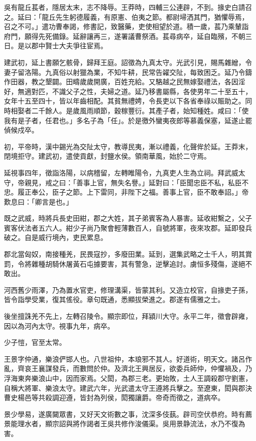 \begin{pinyinscope}
吳有龍丘萇者，隱居太末，志不降辱。王莽時，四輔三公連辟，不到。掾史白請召之。延曰：「龍丘先生躬德履義，有原憲、伯夷之節。都尉埽洒其門，猶懼辱焉，召之不可。」遣功曹奉謁，修書記，致醫藥，吏使相望於道。積一歲，萇乃乘輦詣府門，願得先死備錄。延辭讓再三，遂署議曹祭酒。萇尋病卒，延自臨殯，不朝三日。是以郡中賢士大夫爭往宦焉。

建武初，延上書願乞骸骨，歸拜王庭。詔徵為九真太守。光武引見，賜馬雜繒，令妻子留洛陽。九真俗以射獵為業，不知牛耕，民常告糴交阯，每致困乏。延乃令鑄作田器，教之墾闢。田疇歲歲開廣，百姓充給。又駱越之民無嫁娶禮法，各因淫好，無適對匹，不識父子之性，夫婦之道。延乃移書屬縣，各使男年二十至五十，女年十五至四十，皆以年齒相配。其貧無禮娉，令長吏以下各省奉祿以賑助之。同時相娶者二千餘人。是歲風雨順節，穀稼豐衍。其產子者，始知種姓。咸曰：「使我有是子者，任君也。」多名子為「任」。於是徼外蠻夷夜郎等慕義保塞，延遂止罷偵候戍卒。

初，平帝時，漢中錫光為交阯太守，教導民夷，漸以禮義，化聲侔於延。王莽末，閉境拒守。建武初，遣使貢獻，封鹽水侯。領南華風，始於二守焉。

延視事四年，徵詣洛陽，以病稽留，左轉睢陽令，九真吏人生為立祠。拜武威太守，帝親見，戒之曰：「善事上官，無失名譽。」延對曰：「臣聞忠臣不私，私臣不忠。履正奉公，臣子之節。上下雷同，非陛下之福。善事上官，臣不敢奉詔。」帝歎息曰：「卿言是也。」

既之武威，時將兵長史田紺，郡之大姓，其子弟賓客為人暴害。延收紺繫之，父子賓客伏法者五六人。紺少子尚乃聚會輕薄數百人，自號將軍，夜來攻郡。延即發兵破之。自是威行境內，吏民累息。

郡北當匈奴，南接種羌，民畏寇抄，多廢田業。延到，選集武略之士千人，明其賞罰，令將雜種胡騎休屠黃石屯據要害，其有警急，逆擊追討。虜恒多殘傷，遂絕不敢出。

河西舊少雨澤，乃為置水官吏，修理溝渠，皆蒙其利。又造立校官，自掾吏子孫，皆令詣學受業，復其傜役。章句既通，悉顯拔榮進之。郡遂有儒雅之士。

後坐擅誅羌不先上，左轉召陵令。顯宗即位，拜潁川大守。永平二年，徵會辟雍，因以為河內太守。視事九年，病卒。

少子愷，官至太常。

王景字仲通，樂浪俨邯人也。八世祖仲，本琅邪不其人。好道術，明天文。諸呂作亂，齊哀王襄謀發兵，而數問於仲。及濟北王興居反，欲委兵師仲，仲懼禍及，乃浮海東奔樂浪山中，因而家焉。父閎，為郡三老。更始敗，土人王調殺郡守劉憲，自稱大將軍、樂浪太守。建武六年，光武遣太守王遵將兵擊之。至遼東，閎與郡決曹史楊邑等共殺調迎遵，皆封為列侯，閎獨讓爵。帝奇而徵之，道病卒。

景少學易，遂廣闚眾書，又好天文術數之事，沈深多伎蓺。辟司空伏恭府。時有薦景能理水者，顯宗詔與將作謁者王吳共修作浚儀渠。吳用景静流法，水乃不復為害。


\end{pinyinscope}
